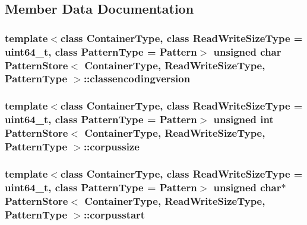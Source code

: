 \subsection{Member Data Documentation}
\hypertarget{classPatternStore_a37f196867dede75f7a9bf72b07a3c24d}{}
\subsubsection[{classencodingversion}]{\setlength{\rightskip}{0pt plus 5cm}template$<$class Container\+Type, class Read\+Write\+Size\+Type = uint64\+\_\+t, class Pattern\+Type = Pattern$>$ unsigned char {\bf Pattern\+Store}$<$ Container\+Type, Read\+Write\+Size\+Type, {\bf Pattern\+Type} $>$\+::classencodingversion\hspace{0.3cm}{\ttfamily [protected]}}\label{classPatternStore_a37f196867dede75f7a9bf72b07a3c24d}
\hypertarget{classPatternStore_aae8c0f162986134d629b0e6b1a63b4cc}{}
\subsubsection[{corpussize}]{\setlength{\rightskip}{0pt plus 5cm}template$<$class Container\+Type, class Read\+Write\+Size\+Type = uint64\+\_\+t, class Pattern\+Type = Pattern$>$ unsigned int {\bf Pattern\+Store}$<$ Container\+Type, Read\+Write\+Size\+Type, {\bf Pattern\+Type} $>$\+::corpussize\hspace{0.3cm}{\ttfamily [protected]}}\label{classPatternStore_aae8c0f162986134d629b0e6b1a63b4cc}
\hypertarget{classPatternStore_a56811e603e5a5ce165a8709216f3f1c5}{}
\subsubsection[{corpusstart}]{\setlength{\rightskip}{0pt plus 5cm}template$<$class Container\+Type, class Read\+Write\+Size\+Type = uint64\+\_\+t, class Pattern\+Type = Pattern$>$ unsigned char$\ast$ {\bf Pattern\+Store}$<$ Container\+Type, Read\+Write\+Size\+Type, {\bf Pattern\+Type} $>$\+::corpusstart\hspace{0.3cm}{\ttfamily [protected]}}\label{classPatternStore_a56811e603e5a5ce165a8709216f3f1c5}
\hypertarget{classPatternStore_aa4ef383cb01f6842e97be70bea0e8c82}{}
